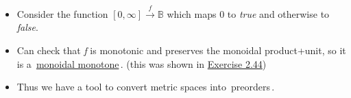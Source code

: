 \begin{itemize}
    \item Consider the function $[0,\infty] \xrightarrow{f} \mathbb{B}$ which maps 0 to \emph{true} and otherwise to \emph{false}.
    \item Can check that \emph{f} is monotonic and preserves the monoidal product+unit, so it is a \,\href{doc/1 math/Seven Sketches in Compositionality/Chapter 2: Resource theories/2 Symmetric monoidal preorders/5 Monoidal monotone maps/1 Monoidal monotone}{monoidal monotone}\,. (this was shown in \href{doc/1 math/Seven Sketches in Compositionality/Chapter 2: Resource theories/2 Symmetric monoidal preorders/5 Monoidal monotone maps/3 Exercise 2-44}{Exercise 2.44})
    \item Thus we have a tool to convert metric spaces into \,preorders\,.
  \end{itemize}